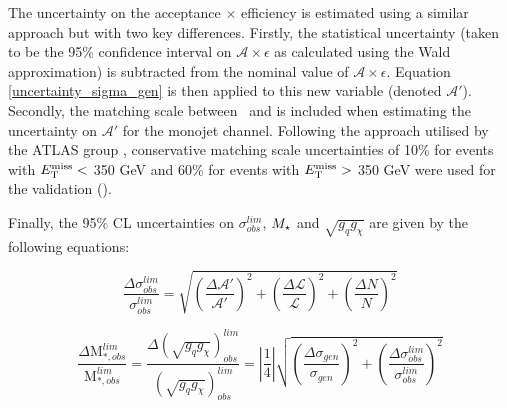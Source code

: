 \begin{flushleft}
\bigskip

The uncertainty on the acceptance $\times$ efficiency is estimated using a similar approach but with two key differences. Firstly, the statistical uncertainty (taken to be the 95\% confidence interval on $\mathcal{A}\times\epsilon$ as calculated using the Wald approximation) is subtracted from the nominal value of $\mathcal{A}\times\epsilon$. Equation \ref{uncertainty_sigma_gen} is then applied to this new variable (denoted $\mathcal{A}'$). Secondly, the matching scale between \MG\mbox{ }and \PYTHIA is included when estimating the uncertainty on $\mathcal{A}'$ for the monojet channel. Following the approach utilised by the ATLAS group \cite{CERN-THESIS-2015-038}, conservative matching scale uncertainties of 10\% for events with $E_{\mathrm{T}}^{\mathrm{miss}} <$ 350 GeV and 60\% for events with $E_{\mathrm{T}}^{\mathrm{miss}} >$ 350 GeV were used for the validation ().
 
\bigskip

Finally, the 95\% CL uncertainties on $\sigma_{obs}^{lim}$, $M_{\star}$ and $\sqrt{g_q g_{\chi}}$ are given by the following equations:

\begin{equation}
\label{uncertainty_sigma_lim}
\frac{\Delta \sigma_{obs}^{lim}}{\sigma_{obs}^{lim}} = \sqrt{\left(\frac{\Delta \mathcal{A}'}{\mathcal{A}'}\right)^{2} + \left(\frac{\Delta \mathcal{L}}{\mathcal{L}}\right)^{2} + \left(\frac{\Delta N}{N}\right)^{2}}
\end{equation}

\begin{equation}
\label{uncertainty_M_star}
\frac{\Delta \mbox{M}_{*,obs}^{lim}}{\mbox{M}_{*,obs}^{lim}} = \frac{\Delta (\sqrt{g_{q}g_{\chi}})_{obs}^{lim}}{(\sqrt{g_{q}g_{\chi}})_{obs}^{lim}} = \left|\frac{1}{4}\right|\sqrt{\left(\frac{\Delta \sigma_{gen}}{\sigma_{gen}}\right)^{2} + \left(\frac{\Delta \sigma_{obs}^{lim}}{\sigma_{obs}^{lim}}\right)^{2}}
\end{equation}

\end{flushleft}
